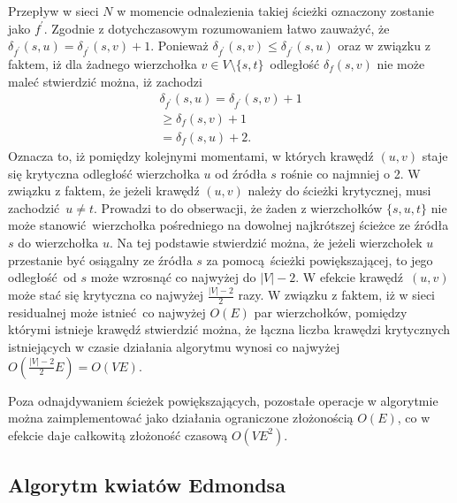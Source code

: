 {\begin{bproof}
    Przepływ w sieci $N$ w momencie odnalezienia takiej ścieżki oznaczony zostanie jako $f^\prime$.
    Zgodnie z dotychczasowym rozumowaniem łatwo zauważyć, że $\delta_{f^\prime}(s, u)=\delta_{f^\prime}(s, v) + 1$.
    Ponieważ $\delta_{f^\prime}(s, v) \leq \delta_{f^\prime}(s, u)$ oraz w związku z faktem, iż dla żadnego wierzchołka $v \in V\setminus \{s, t\}$ odległość $\delta_f(s, v)$ nie może maleć stwierdzić można, iż zachodzi \begin{align*}
        \delta_{f^\prime}(s,u)=\delta_{f^\prime}(s,v)+1\\
                           \geq\delta_f(s, v)+1\\
                              =\delta_f(s, u)+2.
    \end{align*}
    Oznacza to, iż pomiędzy kolejnymi momentami, w których krawędź $(u, v)$ staje się krytyczna odległość wierzchołka $u$ od źródła $s$ rośnie co najmniej o 2.
    W związku z faktem, że jeżeli krawędź $(u, v)$ należy do ścieżki krytycznej, musi zachodzić $u \neq t$.
    Prowadzi to do obserwacji, że żaden z wierzchołków $\{s, u, t\}$ nie może stanowić wierzchołka pośredniego na dowolnej najkrótszej ścieżce ze źródła $s$ do wierzchołka $u$.
    Na tej podstawie stwierdzić można, że jeżeli wierzchołek $u$ przestanie być osiągalny ze źródła $s$ za pomocą ścieżki powiększającej, to jego odległość od $s$ może wzrosnąć co najwyżej do $|V|-2$.
    W efekcie krawędź $(u, v)$ może stać się krytyczna co najwyżej $\frac{|V|-2}{2}$ razy.
    W związku z faktem, iż w sieci residualnej może istnieć co najwyżej $O(E)$ par wierzchołków, pomiędzy którymi istnieje krawędź stwierdzić można, że łączna liczba krawędzi krytycznych istniejących w czasie działania algorytmu wynosi co najwyżej $O(\frac{|V|-2}{2}E)=O(VE)$.
  \end{bproof}

  Poza odnajdywaniem ścieżek powiększających, pozostałe operacje w algorytmie można zaimplementować jako działania ograniczone złożonością $O(E)$, co w efekcie daje całkowitą złożoność czasową $O(VE^2)$.
}
\subsection{\textbf{Algorytm kwiatów Edmondsa}}\label{ss_edmonds}